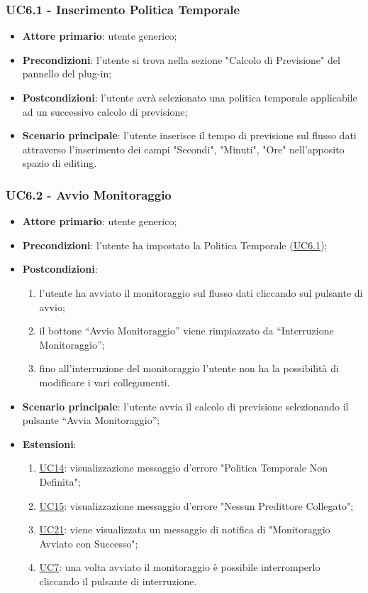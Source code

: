 	
	\label{par:UC6.1}
	\subsubsection{UC6.1 - Inserimento Politica Temporale}
		\begin{itemize}
			\item\textbf{Attore primario}: utente generico;
			\item\textbf{Precondizioni}: l'utente si trova nella sezione "Calcolo di Previsione" del pannello del plug-in;
			\item\textbf{Postcondizioni}: l’utente avrà selezionato una politica temporale applicabile ad un successivo calcolo di previsione;
			\item\textbf{Scenario principale}: l’utente inserisce il tempo di previsione sul flusso dati attraverso l'inserimento dei campi "Secondi", "Minuti", "Ore" nell’apposito spazio di editing.
		\end{itemize}	

	\label{par:UC6.2}
	\subsubsection{UC6.2 - Avvio Monitoraggio}
		\begin{itemize}
			\item\textbf{Attore primario}: utente generico;
			\item\textbf{Precondizioni}: l’utente ha impostato la Politica Temporale (\hyperref[par:UC6.1]{UC6.1});
			\item\textbf{Postcondizioni}:
				\begin{enumerate}
					\item l’utente ha avviato il monitoraggio sul flusso dati cliccando sul pulsante di avvio;
					\item il bottone “Avvio Monitoraggio” viene rimpiazzato da “Interruzione Monitoraggio”;
					\item fino all’interruzione del monitoraggio l’utente non ha la possibilità di modificare i vari collegamenti.
				\end{enumerate}
			\item\textbf{Scenario principale}: l’utente avvia il calcolo di previsione selezionando il pulsante “Avvia Monitoraggio”;
			\item\textbf{Estensioni}:
				\begin{enumerate}
					\item \hyperref[par:UC14]{UC14}: visualizzazione messaggio d’errore "Politica Temporale Non Definita";
					\item \hyperref[par:UC15]{UC15}: visualizzazione messaggio d’errore "Nessun Predittore Collegato";
					\item \hyperref[par:UC21]{UC21}: viene visualizzata un messaggio di notifica di "Monitoraggio Avviato con Successo";
					\item \hyperref[par:UC7]{UC7}: una volta avviato il monitoraggio è possibile interromperlo cliccando il pulsante di interruzione.
				\end{enumerate}
			
				
		\end{itemize}	

